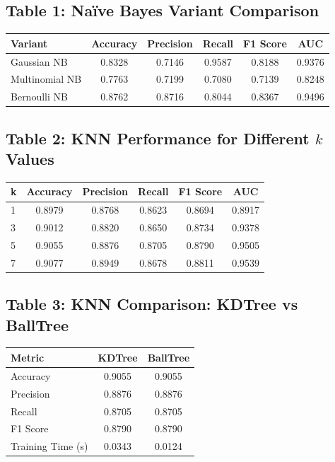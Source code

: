 \documentclass[12pt]{article}
\begin{document}
\subsection*{Table 1: Naïve Bayes Variant Comparison}
\begin{center}
\begin{tabular}{lccccc}
\toprule
\textbf{Variant} & \textbf{Accuracy} & \textbf{Precision} & \textbf{Recall} & \textbf{F1 Score} & \textbf{AUC} \\
\midrule
Gaussian NB & 0.8328 & 0.7146 & 0.9587 & 0.8188 & 0.9376 \\
Multinomial NB & 0.7763 & 0.7199 & 0.7080 & 0.7139 & 0.8248 \\
Bernoulli NB & 0.8762 & 0.8716 & 0.8044 & 0.8367 & 0.9496 \\
\bottomrule
\end{tabular}
\end{center}

\subsection*{Table 2: KNN Performance for Different $k$ Values}
\begin{center}
\begin{tabular}{lccccc}
\toprule
\textbf{k} & \textbf{Accuracy} & \textbf{Precision} & \textbf{Recall} & \textbf{F1 Score} & \textbf{AUC} \\
\midrule
1 & 0.8979 & 0.8768 & 0.8623 & 0.8694 & 0.8917 \\
3 & 0.9012 & 0.8820 & 0.8650 & 0.8734 & 0.9378 \\
5 & 0.9055 & 0.8876 & 0.8705 & 0.8790 & 0.9505 \\
7 & 0.9077 & 0.8949 & 0.8678 & 0.8811 & 0.9539 \\
\bottomrule
\end{tabular}
\end{center}

\subsection*{Table 3: KNN Comparison: KDTree vs BallTree}
\begin{center}
\begin{tabular}{lcc}
\toprule
\textbf{Metric} & \textbf{KDTree} & \textbf{BallTree} \\
\midrule
Accuracy & 0.9055 & 0.9055 \\
Precision & 0.8876 & 0.8876 \\
Recall & 0.8705 & 0.8705 \\
F1 Score & 0.8790 & 0.8790 \\
Training Time (s) & 0.0343 & 0.0124 \\
\bottomrule
\end{tabular}
\end{center}
\end{document}
